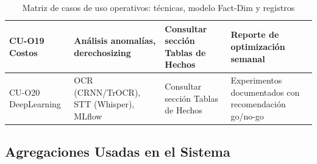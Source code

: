 ﻿\documentclass[11pt, letterpaper]{article}
\begin{document}
\begin{table}[H]
\begin{tabularx}{\linewidth}{>{\raggedright\arraybackslash}p{2cm} >{\raggedright\arraybackslash}p{3.5cm} >{\raggedright\arraybackslash}p{3.5cm} >{\raggedright\arraybackslash}X}
\midrule

CU-O19 Costos & Análisis anomalías, derechosizing & Consultar sección Tablas de Hechos & Reporte de optimización semanal \\

\midrule

CU-O20 DeepLearning & OCR (CRNN/TrOCR), STT (Whisper), MLflow & Consultar sección Tablas de Hechos & Experimentos documentados con recomendación go/no-go \\

\bottomrule

\end{tabularx}

\caption{Matriz de casos de uso operativos: técnicas, modelo Fact-Dim y registros}

\end{table}




\subsection{Agregaciones Usadas en el Sistema}
\end{document}
